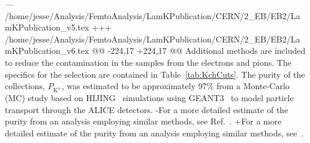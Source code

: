 --- /home/jesse/Analysis/FemtoAnalysis/LamKPublication/CERN/2_EB/EB2/LamKPublication_v5.tex
+++ /home/jesse/Analysis/FemtoAnalysis/LamKPublication/CERN/2_EB/EB2/LamKPublication_v6.tex
@@ -224,17 +224,17 @@
 Additional methods are included to reduce the contamination in the \Kpm samples from the electrons and pions.  
 The specifics for the \Kpm selection are contained in Table~\ref{tab:KchCuts}.
 The purity of the \Kpm collections, $P_{\mathrm{K}^{\pm}}$, was estimated to be approximately 97\% from a Monte-Carlo (MC) study based on HIJING~\cite{PhysRevD.44.3501} simulations using GEANT3~\cite{Brun:1082634} to model particle transport through the ALICE detectors. 
-For a more detailed estimate of the \Kpm purity from an analysis employing similar methods, see Ref.~\cite{Acharya:2017qtq}.
+For a more detailed estimate of the \Kpm purity from an analysis employing similar methods, see~\cite{Acharya:2017qtq}.
 
